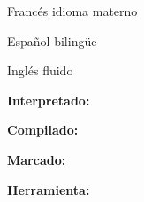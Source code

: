 \begin{skilllist}[7.7][\tbfborderleft][17]

\emergencystretch 0.1cm


\vspace{0.3cm}
\begin{languagelist}
\item{Francés}     {idioma materno}
\item{Español}     {bilingüe}
\item{Inglés}     {fluido}
\end{languagelist}
\vspace{-0.5cm}


    \textbf{Interpretado:}\tbfsoftinterpreted
    \vspace{-0.3cm}

    \textbf{Compilado:}\tbfsoftcompiled
    \vspace{-0.3cm}

    \textbf{Marcado:}\tbfsoftmarkup
    \vspace{-0.3cm}

    \textbf{Herramienta:}\tbfsofttool


\end{skilllist}



